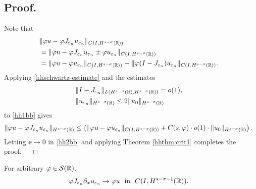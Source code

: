 			\subsection{ Proof.} Note that
			\begin{equation}
				\begin{split}
					& \|\varphi u - \varphi J_{\varepsilon_n} u_{\varepsilon_n}
					\|_{C(I, H^{s-\sigma}(\mathbb{R}))}
					\\
					&= \|\varphi u - \varphi J_{\varepsilon_n} u_{\varepsilon_n} \pm \varphi
					u_{\varepsilon_n} \|_{C(I, H^{s-\sigma}(\mathbb{R}))}
					\\
					& = \|\varphi u - \varphi u_{\varepsilon_n}
					\|_{C(I, H^{s-\sigma}(\mathbb{R}))} + \|\varphi (I - J_{\varepsilon_n})
					u_{\varepsilon_n} \|_{C(I, H^{s-\sigma}(\mathbb{R}))}.
					\label{hh1bb}
				\end{split}
			\end{equation}
			Applying \eqref{hhschwartz-estimate} and the estimates
			\begin{equation*}
				\begin{split}
					& \|I-J_{\varepsilon_n} \|_{L(H^{s-\sigma}(\mathbb{R}), H^{s -
					\sigma}(\mathbb{R}))} = o(1),
					\\
					& \|u_{\varepsilon_n}\|_{H^{s-\sigma}(\mathbb{R})} \le 2
					\|u_0\|_{H^{s-\sigma}(\mathbb{R})}
				\end{split}
			\end{equation*}
			to \eqref{hh1bb} gives
			\begin{equation}
				\label{hh2bb}
				\begin{split}
					\|\varphi u - \varphi J_{\varepsilon_n} u_{\varepsilon_n}\|_{H^{s-\sigma}(\mathbb{R})}
					\le \left( \|\varphi u - \varphi u_{\varepsilon_n}
					\|_{C(I, H^{s-\sigma}(\mathbb{R}))} + C(s, \varphi) \cdot o(1) \cdot \|u_0
					\|_{H^{s-\sigma}(\mathbb{R})} \right).
				\end{split}
			\end{equation}
			Letting $\ee \to 0$ in \eqref{hh2bb} and applying Theorem
			\ref{hhthm:crit1} completes the proof. $\quad \Box$
			\begin{proposition}
				\label{hhprop:dd}
				For arbitrary $ \varphi \in \mathcal{S}(\mathbb{R})$,
				\begin{equation}
					\begin{split}
						\varphi J_{\varepsilon_n} \partial_x u_{\varepsilon_n} \to \varphi u \ \
						\text{in} \ \ C(I, H^{s-\sigma-1}(\mathbb{R})).
						\label{hh0dd}
					\end{split}
				\end{equation}
			\end{proposition}
